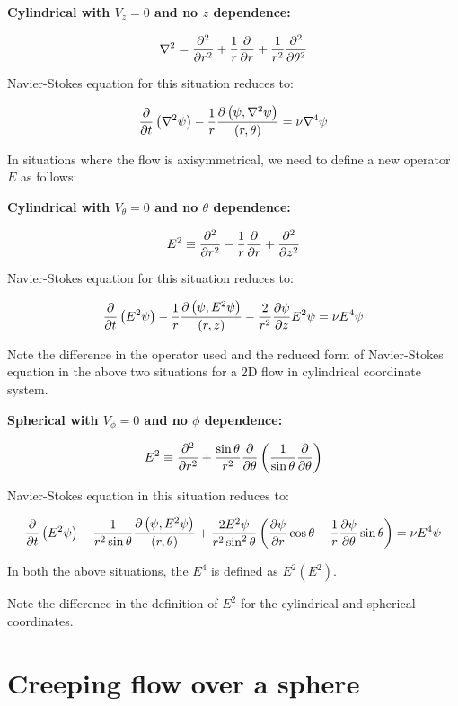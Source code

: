 {\bf Cylindrical with $V_z=0$ and no $z$ dependence:}

$$ \nabla^2 = {\partial^2 \over \partial r^2} + {1 \over r} {\partial \over \partial r} + {1 \over r^2} {\partial^2 \over \partial \theta^2} $$

Navier-Stokes equation for this situation reduces to:

$$ {\partial \over \partial t} \left( \nabla^2 \psi \right) - {1 \over r} {\partial\left( \psi, \nabla^2 \psi\right) \over \left(r, \theta \right)} = \nu \nabla^4 \psi $$


In situations where the flow is axisymmetrical, we need to define a new operator $E$ as follows:


{\bf Cylindrical with $V_\theta=0$ and no $\theta$ dependence:}

$$ E^2 \equiv {\partial^2 \over \partial r^2} - {1 \over r} {\partial \over \partial r} + {\partial^2 \over \partial z^2} $$

Navier-Stokes equation for this situation reduces to:

$$ {\partial \over \partial t} \left( E^2 \psi \right) - {1 \over r} {\partial\left( \psi, E^2 \psi\right) \over \left(r, z \right)} - {2 \over r^2} {\partial \psi \over \partial z} E^2 \psi = \nu E^4 \psi $$


Note the difference in the operator used and the reduced form of Navier-Stokes equation in the above two situations for a 2D flow in cylindrical coordinate system. 

{\bf Spherical with $V_\phi =0$ and no $\phi$ dependence:}


$$ E^2 \equiv {\partial^2 \over \partial r^2} + {\sin \theta \over r^2} {\partial \over \partial \theta} \left( {1 \over \sin\theta} {\partial \over \partial \theta} \right) $$

Navier-Stokes equation in this situation reduces to:

$$ {\partial \over \partial t} \left( E^2 \psi \right) - {1 \over r^2 \sin\theta} {\partial\left( \psi, E^2 \psi\right) \over \left(r, \theta \right)} + {2 E^2 \psi \over r^2 \sin^2\theta} \left( {\partial \psi \over \partial r} \cos\theta - {1 \over r} {\partial \psi \over \partial \theta} \sin\theta \right) = \nu E^4 \psi $$


In both the above situations, the $E^4$ is defined as $E^2 \left(E^2 \right)$.


Note the difference in the definition of $E^2$ for the cylindrical and spherical coordinates.


\section{Creeping flow over a sphere}

